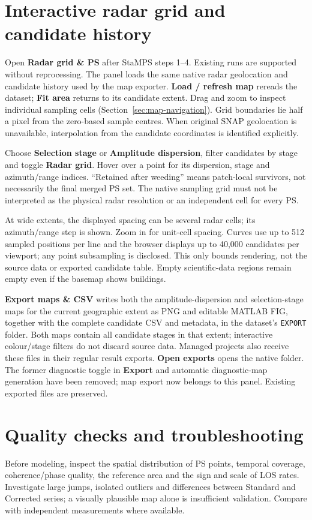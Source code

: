\section{Interactive radar grid and candidate history}\label{sec:radar-grid}
Open \textbf{Radar grid \& PS} after StaMPS steps 1--4. Existing runs are supported without reprocessing. The panel loads the same native radar geolocation and candidate history used by the map exporter. \textbf{Load / refresh map} rereads the dataset; \textbf{Fit area} returns to its candidate extent. Drag and zoom to inspect individual sampling cells (Section~\ref{sec:map-navigation}). Grid boundaries lie half a pixel from the zero-based sample centres. When original SNAP geolocation is unavailable, interpolation from the candidate coordinates is identified explicitly.

Choose \textbf{Selection stage} or \textbf{Amplitude dispersion}, filter candidates by stage and toggle \textbf{Radar grid}. Hover over a point for its dispersion, stage and azimuth/range indices. ``Retained after weeding'' means patch-local survivors, not necessarily the final merged PS set. The native sampling grid must not be interpreted as the physical radar resolution or an independent cell for every PS.

At wide extents, the displayed spacing can be several radar cells; its azimuth/range step is shown. Zoom in for unit-cell spacing. Curves use up to 512 sampled positions per line and the browser displays up to 40,000 candidates per viewport; any point subsampling is disclosed. This only bounds rendering, not the source data or exported candidate table. Empty scientific-data regions remain empty even if the basemap shows buildings.

\textbf{Export maps \& CSV} writes both the amplitude-dispersion and selection-stage maps for the current geographic extent as PNG and editable MATLAB FIG, together with the complete candidate CSV and metadata, in the dataset's \texttt{EXPORT} folder. Both maps contain all candidate stages in that extent; interactive colour/stage filters do not discard source data. Managed projects also receive these files in their regular result exports. \textbf{Open exports} opens the native folder. The former diagnostic toggle in \textbf{Export} and automatic diagnostic-map generation have been removed; map export now belongs to this panel. Existing exported files are preserved.

\section{Quality checks and troubleshooting}
Before modeling, inspect the spatial distribution of PS points, temporal coverage, coherence/phase quality, the reference area and the sign and scale of LOS rates. Investigate large jumps, isolated outliers and differences between Standard and Corrected series; a visually plausible map alone is insufficient validation. Compare with independent measurements where available.


